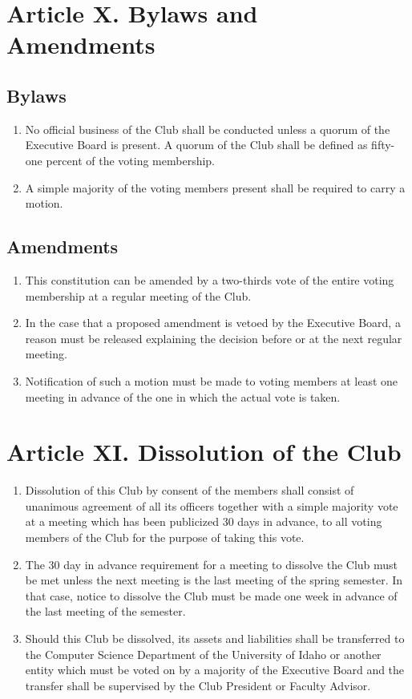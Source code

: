 \documentclass[12pt]{scrartcl} %
\begin{document}
\section{Article X. Bylaws and Amendments}

	\subsection{Bylaws}
		\begin{enumerate}
			\item No official business of the Club shall be conducted unless a quorum of the Executive Board is present. A quorum of the Club shall be defined as fifty-one percent of the voting membership.
			\item A simple majority of the voting members present shall be required to carry a motion.
		\end{enumerate}

	\subsection{Amendments}
		\begin{enumerate}
			\item This constitution can be amended by a two-thirds vote of the entire voting membership at a regular meeting of the Club.
			\item In the case that a proposed amendment is vetoed by the Executive Board, a reason must be released explaining the decision before or at the next regular meeting.
			\item Notification of such a motion must be made to voting members at least one meeting in advance of the one in which the actual vote is taken.
		\end{enumerate}

\section{Article XI. Dissolution of the Club}
		\begin{enumerate}
			\item Dissolution of this Club by consent of the members shall consist of unanimous agreement of all its officers together with a simple majority vote at a meeting which has been publicized 30 days in advance, to all voting members of the Club for the purpose of taking this vote.
			\item The 30 day in advance requirement for a meeting to dissolve the Club must be met unless the next meeting is the last meeting of the spring semester.  In that case, notice to dissolve the Club must be made one week in advance of the last meeting of the semester.
			\item Should this Club be dissolved, its assets and liabilities shall be transferred to the Computer Science Department of the University of Idaho or another entity which must be voted on by a majority of the Executive Board and the transfer shall be supervised by the Club President or Faculty Advisor.
		\end{enumerate}
\end{document}
